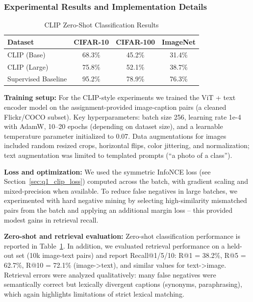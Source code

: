 \documentclass[conference]{IEEEtran}
\begin{document}
\subsubsection{Experimental Results and Implementation Details}
\label{sec:q1_clip_results}

\begin{table}[H]
\centering
\caption{CLIP Zero-Shot Classification Results}
\begin{tabular}{l c c c}
\toprule
Dataset & CIFAR-10 & CIFAR-100 & ImageNet \\
\midrule
CLIP (Base) & 68.3\% & 45.2\% & 31.4\% \\
CLIP (Large) & 75.8\% & 52.1\% & 38.7\% \\
Supervised Baseline & 95.2\% & 78.9\% & 76.3\% \\
\midrule
\end{tabular}
\label{tab:clip_results}
\end{table}

\textbf{Training setup:} For the CLIP-style experiments we trained the ViT + text encoder model on the assignment-provided image-caption pairs (a cleaned Flickr/COCO subset). Key hyperparameters: batch size 256, learning rate 1e-4 with AdamW, 10--20 epochs (depending on dataset size), and a learnable temperature parameter initialized to 0.07. Data augmentations for images included random resized crops, horizontal flips, color jittering, and normalization; text augmentation was limited to templated prompts (``a photo of a {class}'').

\textbf{Loss and optimization:} We used the symmetric InfoNCE loss (see Section~\ref{sec:q1_clip_loss}) computed across the batch, with gradient scaling and mixed-precision when available. To reduce false negatives in large batches, we experimented with hard negative mining by selecting high-similarity mismatched pairs from the batch and applying an additional margin loss -- this provided modest gains in retrieval recall.

\textbf{Zero-shot and retrieval evaluation:} Zero-shot classification performance is reported in Table~\ref{tab:clip_results}. In addition, we evaluated retrieval performance on a held-out set (10k image-text pairs) and report Recall@1/5/10: R@1 = 38.2\%, R@5 = 62.7\%, R@10 = 72.1\% (image->text), and similar values for text->image. Retrieval errors were analyzed qualitatively: many false negatives were semantically correct but lexically divergent captions (synonyms, paraphrasing), which again highlights limitations of strict lexical matching.
\end{document}
